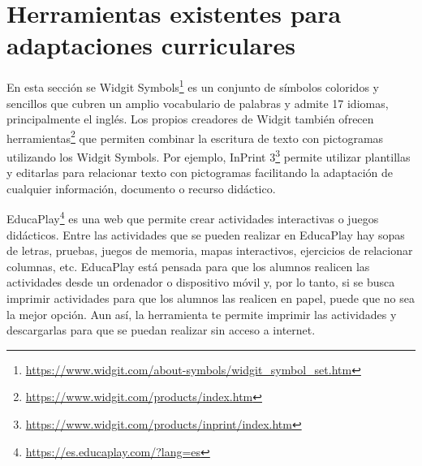 \section{Herramientas existentes para adaptaciones curriculares}\label{cap:herramientas}
En esta sección se 
Widgit Symbols\footnote{\url{https://www.widgit.com/about-symbols/widgit_symbol_set.htm}} es un conjunto de símbolos coloridos y sencillos que cubren un amplio vocabulario de palabras y admite 17 idiomas, principalmente el inglés. Los propios creadores de Widgit también ofrecen herramientas\footnote{\url{https://www.widgit.com/products/index.htm}} que permiten combinar la escritura de texto con pictogramas utilizando los Widgit Symbols. Por ejemplo, InPrint 3\footnote{\url{https://www.widgit.com/products/inprint/index.htm}} permite utilizar plantillas y editarlas para relacionar texto con pictogramas facilitando la adaptación de cualquier información, documento o recurso didáctico.

EducaPlay\footnote{\url{https://es.educaplay.com/?lang=es}} es una web que permite crear actividades interactivas o juegos didácticos. Entre las actividades que se pueden realizar en EducaPlay hay sopas de letras, pruebas, juegos de memoria, mapas interactivos, ejercicios de relacionar columnas, etc. EducaPlay está pensada para que los alumnos realicen las actividades desde un ordenador o dispositivo móvil y, por lo tanto, si se busca imprimir actividades para que los alumnos las realicen en papel, puede que no sea la mejor opción. Aun así, la herramienta te permite imprimir las actividades y descargarlas para que se puedan realizar sin acceso a internet.

